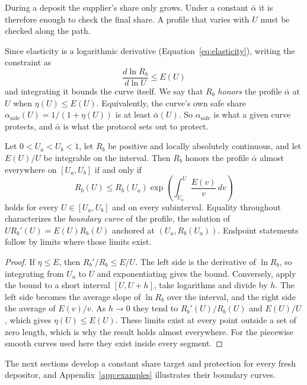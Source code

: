 \documentclass[11pt,a4paper]{article}
\begin{document}
During a deposit the supplier's share only grows. Under a constant $\bar\alpha$ it is therefore enough to check the final share. A profile that varies with $U$ must be checked along the path.

Since elasticity is a logarithmic derivative (Equation~\ref{eq:elasticity}), writing the constraint as
\begin{equation}
\frac{d\ln R_b}{d\ln U}\leq E(U)
\end{equation}
and integrating it bounds the curve itself. We say that $R_b$ \emph{honors} the profile $\bar\alpha$ at $U$ when $\eta(U)\leq E(U)$. Equivalently, the curve's own safe share $\alpha_{\mathrm{safe}}(U)=1/(1+\eta(U))$ is at least $\bar\alpha(U)$. So $\alpha_{\mathrm{safe}}$ is what a given curve protects, and $\bar\alpha$ is what the protocol sets out to protect.

\begin{theorem}
\label{thm:family}
Let $0<U_a<U_b<1$, let $R_b$ be positive and locally absolutely continuous, and let $E(U)/U$ be integrable on the interval. Then $R_b$ honors the profile $\bar\alpha$ almost everywhere on $[U_a,U_b]$ if and only if
\begin{equation}
\boxed{
R_b(U)\leq R_b(U_a)\exp\left(\int_{U_a}^{U}\frac{E(v)}{v}\,dv\right)
}
\label{eq:family}
\end{equation}
holds for every $U\in[U_a,U_b]$ and on every subinterval. Equality throughout characterizes the \emph{boundary curve} of the profile, the solution of $UR_b'(U)=E(U)R_b(U)$ anchored at $(U_a,R_b(U_a))$. Endpoint statements follow by limits where those limits exist.
\end{theorem}
\begin{proof}
If $\eta\leq E$, then $R_b'/R_b\leq E/U$. The left side is the derivative of $\ln R_b$, so integrating from $U_a$ to $U$ and exponentiating gives the bound. Conversely, apply the bound to a short interval $[U,U+h]$, take logarithms and divide by $h$. The left side becomes the average slope of $\ln R_b$ over the interval, and the right side the average of $E(v)/v$. As $h\to0$ they tend to $R_b'(U)/R_b(U)$ and $E(U)/U$, which gives $\eta(U)\leq E(U)$. These limits exist at every point outside a set of zero length, which is why the result holds almost everywhere. For the piecewise smooth curves used here they exist inside every segment.
\end{proof}

The next sections develop a constant share target and protection for every fresh depositor, and Appendix~\ref{app:examples} illustrates their boundary curves.
\end{document}
